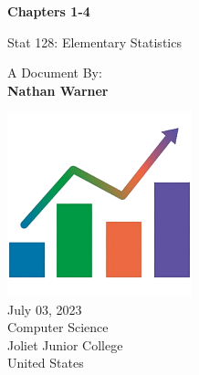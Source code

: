 \documentclass{report}
\title{\Huge{}}
\author{\huge{Nathan Warner}}
\date{\huge{}}
\begin{document}
        \begin{titlepage}
       \begin{center}
           \vspace*{1cm}
    
           \textbf{Chapters 1-4}
    
           \vspace{0.5cm}
           Stat 128: Elementary Statistics
            
                
           \vspace{1.5cm}
   
           A Document By: \\
           \textbf{Nathan Warner}
    
           \vfill
                
                
           \vspace{0.8cm}
         
           \includegraphics[width=0.4\textwidth]{./figures/2.png} \\
            July 03, 2023  \\
           Computer Science \\
           Joliet Junior College \\
           United States\\
           
                
       \end{center}
    \end{titlepage}
    \tableofcontents
    \pagebreak \bigbreak \noindent
\end{document}
